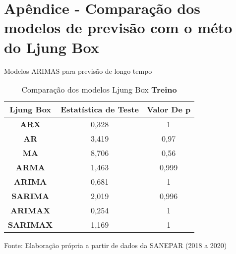 
\section{Ap\^endice - Compara\c c\~ao dos modelos de previs\~ao com o m\'eto do Ljung Box}\label{sec:comtb18}



Modelos ARIMAS para previsão de longo tempo 

	\begin{table}[H]
		\centering
		\caption{Comparação dos modelos Ljung Box \textbf{Treino} }\label{tb:lbtrn}
	\begin{tabular}{@{}ccc@{}}
		\toprule
		\textbf{Ljung Box} & \textbf{Estatística de Teste} & \textbf{Valor De p} \\ \midrule
		\textbf{ARX}       & 0,328                         & 1                   \\
		\textbf{AR}        & 3,419                         & 0,97                \\
		\textbf{MA}        & 8,706                         & 0,56                \\
		\textbf{ARMA}      & 1,463                         & 0,999               \\
		\textbf{ARIMA}     & 0,681                         & 1                   \\
		\textbf{SARIMA}    & 2,019                         & 0,996               \\
		\textbf{ARIMAX}    & 0,254                         & 1                   \\
		\textbf{SARIMAX}   & 1,169                         & 1                   \\ \bottomrule
	\end{tabular}

Fonte: Elaboração própria a partir de dados da SANEPAR (2018 a 2020)
	\end{table}

